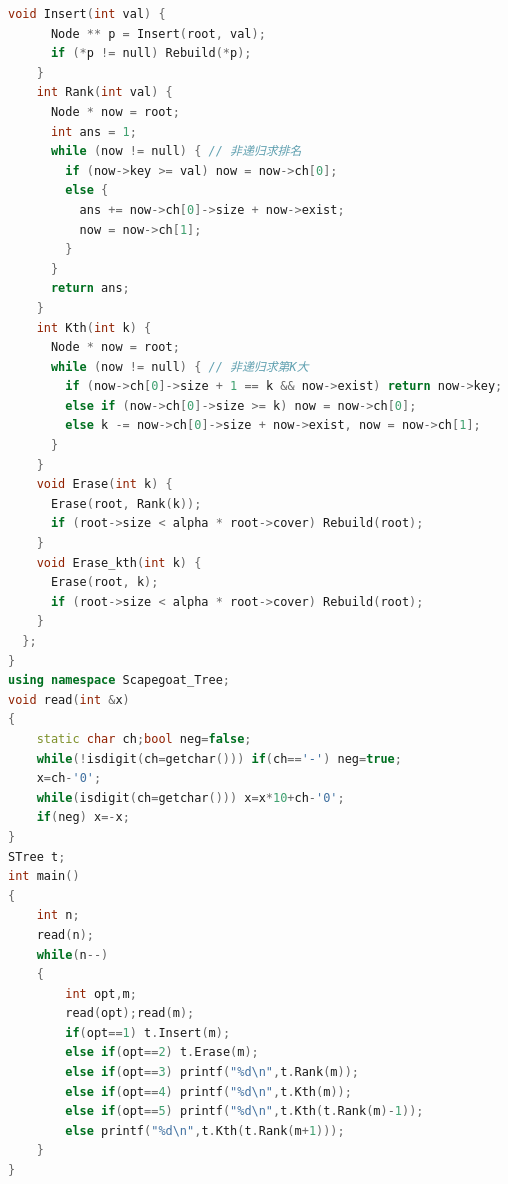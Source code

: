 \documentclass[UTF8,a4paper,titlepage]{ctexart}
\begin{document}
\begin{lstlisting}[language=C++]
    void Insert(int val) {
      Node ** p = Insert(root, val);
      if (*p != null) Rebuild(*p);
    }
    int Rank(int val) {
      Node * now = root;
      int ans = 1;
      while (now != null) { // 非递归求排名
        if (now->key >= val) now = now->ch[0];
        else {
          ans += now->ch[0]->size + now->exist;
          now = now->ch[1];
        }
      }
      return ans;
    }
    int Kth(int k) {
      Node * now = root;
      while (now != null) { // 非递归求第K大
        if (now->ch[0]->size + 1 == k && now->exist) return now->key;
        else if (now->ch[0]->size >= k) now = now->ch[0];
        else k -= now->ch[0]->size + now->exist, now = now->ch[1];
      }
    }
    void Erase(int k) {
      Erase(root, Rank(k));
      if (root->size < alpha * root->cover) Rebuild(root);
    }
    void Erase_kth(int k) {
      Erase(root, k);
      if (root->size < alpha * root->cover) Rebuild(root);
    }
  };
}
using namespace Scapegoat_Tree;
void read(int &x)
{
    static char ch;bool neg=false;
    while(!isdigit(ch=getchar())) if(ch=='-') neg=true;
    x=ch-'0';
    while(isdigit(ch=getchar())) x=x*10+ch-'0';
    if(neg) x=-x;
}
STree t;
int main()
{
    int n;
    read(n);
    while(n--)
    {
        int opt,m;
        read(opt);read(m);
        if(opt==1) t.Insert(m);
        else if(opt==2) t.Erase(m);
        else if(opt==3) printf("%d\n",t.Rank(m));
        else if(opt==4) printf("%d\n",t.Kth(m));
        else if(opt==5) printf("%d\n",t.Kth(t.Rank(m)-1));
        else printf("%d\n",t.Kth(t.Rank(m+1)));
    }
}
         \end{lstlisting}
\end{document}
